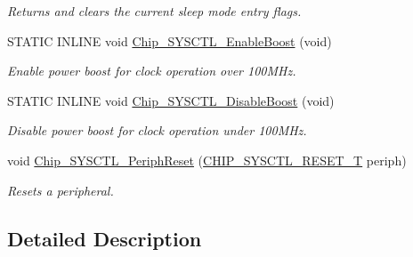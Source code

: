 \begin{DoxyCompactItemize}
\begin{DoxyCompactList}\small\item\em Returns and clears the current sleep mode entry flags. \end{DoxyCompactList}\item 
S\+T\+A\+T\+I\+C I\+N\+L\+I\+N\+E void \hyperlink{group___s_y_s_c_t_l__17_x_x__40_x_x_gaaf987cc6cf1398ae226aaebb975a6372}{Chip\+\_\+\+S\+Y\+S\+C\+T\+L\+\_\+\+Enable\+Boost} (void)
\begin{DoxyCompactList}\small\item\em Enable power boost for clock operation over 100\+M\+Hz. \end{DoxyCompactList}\item 
S\+T\+A\+T\+I\+C I\+N\+L\+I\+N\+E void \hyperlink{group___s_y_s_c_t_l__17_x_x__40_x_x_ga3c49515056cbc9af430e33f9d8401487}{Chip\+\_\+\+S\+Y\+S\+C\+T\+L\+\_\+\+Disable\+Boost} (void)
\begin{DoxyCompactList}\small\item\em Disable power boost for clock operation under 100\+M\+Hz. \end{DoxyCompactList}\item 
void \hyperlink{group___s_y_s_c_t_l__17_x_x__40_x_x_ga94ee3796eba43742e11809eacb88269b}{Chip\+\_\+\+S\+Y\+S\+C\+T\+L\+\_\+\+Periph\+Reset} (\hyperlink{group___s_y_s_c_t_l__17_x_x__40_x_x_gaecf57441c240b2e654da2a7de6da0f7b}{C\+H\+I\+P\+\_\+\+S\+Y\+S\+C\+T\+L\+\_\+\+R\+E\+S\+E\+T\+\_\+\+T} periph)
\begin{DoxyCompactList}\small\item\em Resets a peripheral. \end{DoxyCompactList}\end{DoxyCompactItemize}


\subsection{Detailed Description}


